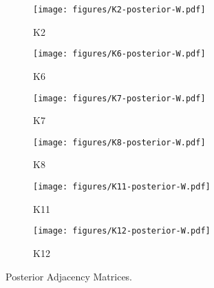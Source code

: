 \begin{figure}[t]
	\centering
	\begin{subfigure}{0.31\textwidth}
		\centering
		\texttt{[image: figures/K2-posterior-W.pdf]}
		\caption{K2}
	\end{subfigure}
	\begin{subfigure}{0.31\textwidth}
		\centering
		\texttt{[image: figures/K6-posterior-W.pdf]}
		\caption{K6}
	\end{subfigure}
	\begin{subfigure}{0.31\textwidth}
		\centering
		\texttt{[image: figures/K7-posterior-W.pdf]}
		\caption{K7}
	\end{subfigure}
	\begin{subfigure}{0.31\textwidth}
		\centering
		\texttt{[image: figures/K8-posterior-W.pdf]}
		\caption{K8}
	\end{subfigure}
	\begin{subfigure}{0.31\textwidth}
		\centering
		\texttt{[image: figures/K11-posterior-W.pdf]}
		\caption{K11}
	\end{subfigure}
	\begin{subfigure}{0.31\textwidth}
		\centering
		\texttt{[image: figures/K12-posterior-W.pdf]}
		\caption{K12}
	\end{subfigure}
	\caption{Posterior Adjacency Matrices.}
	\label{fig:K-posterior-2}
\end{figure}

